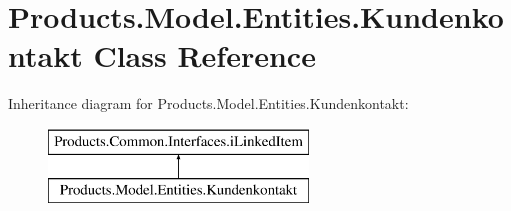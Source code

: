 \hypertarget{class_products_1_1_model_1_1_entities_1_1_kundenkontakt}{}\section{Products.\+Model.\+Entities.\+Kundenkontakt Class Reference}
\label{class_products_1_1_model_1_1_entities_1_1_kundenkontakt}
Inheritance diagram for Products.\+Model.\+Entities.\+Kundenkontakt\+:\begin{figure}[H]
\begin{center}
\leavevmode
\includegraphics[height=2.000000cm]{class_products_1_1_model_1_1_entities_1_1_kundenkontakt}
\end{center}
\end{figure}
